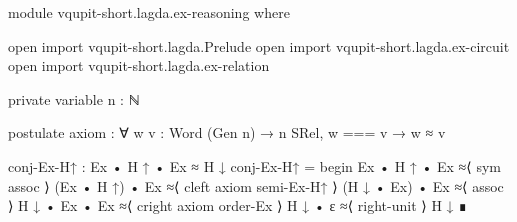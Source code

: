 ﻿\begin{code}[hide]
module vqupit-short.lagda.ex-reasoning where

open import vqupit-short.lagda.Prelude
open import vqupit-short.lagda.ex-circuit
open import vqupit-short.lagda.ex-relation

private variable
  n : ℕ

postulate
  axiom : ∀ {w v : Word (Gen n)} → n SRel, w === v → w ≈ v
\end{code}
\begin{code}
conj-Ex-H↑ : Ex • H ↑ • Ex ≈ H ↓
conj-Ex-H↑ = begin
  Ex • H ↑ • Ex    ≈⟨ sym assoc ⟩
  (Ex • H ↑) • Ex  ≈⟨ cleft axiom semi-Ex-H↑ ⟩
  (H ↓ • Ex) • Ex  ≈⟨ assoc ⟩
  H ↓ • Ex • Ex    ≈⟨ cright axiom order-Ex ⟩
  H ↓ • ε          ≈⟨ right-unit ⟩
  H ↓ ∎
\end{code}
